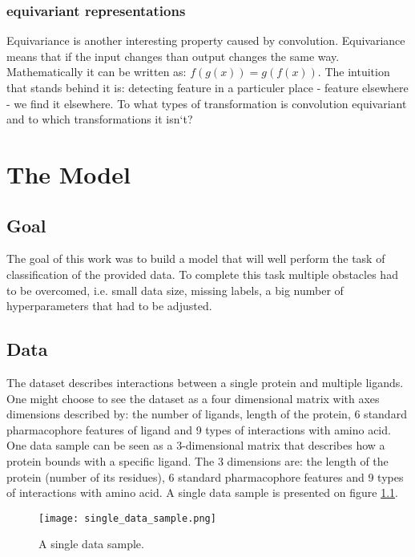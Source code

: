 \documentclass[a4paper,10pt]{report}
\begin{document}
	\subsection{equivariant representations} %
	  Equivariance is another interesting property caused by convolution. Equivariance means that if the input changes than output changes the same way. Mathematically it can be written as: $f(g(x)) = g(f(x))$. The intuition that stands behind it is: detecting feature in a particuler place - feature elsewhere - we find it elsewhere. To what types of transformation is convolution equivariant and to which transformations it isn`t? 
	
	
  \chapter{The Model}\label{chap:OUR_MODEL}
      
      \section{Goal}
      The goal of this work was to build a model that will well perform the task of classification of the provided data. To complete this task multiple obstacles had to be overcomed, i.e. small data size, missing labels, a big number of hyperparameters that had to be adjusted. 
     
	 
      
      \section{Data}\label{sec:OUR_DATA}
	The dataset describes interactions between a single protein and multiple ligands. One might choose to see the dataset as a four dimensional matrix with axes dimensions described by: the number of ligands, length of the protein, 6 standard pharmacophore features of ligand and 9 types of interactions with amino acid\cite{2DSIFT}. One data sample can be seen as a 3-dimensional matrix that describes how a protein bounds with a specific ligand. The 3 dimensions are: the length of the protein (number of its residues), 6 standard pharmacophore features and 9 types of interactions with amino acid. A single data sample is presented on figure \ref{fig:single_data_sample2}. 
	
	\begin{figure}[h!]
	  \centering
	  \texttt{[image: single\_data\_sample.png]}
	  \caption{A single data sample.}
	  \label{fig:single_data_sample2}
	\end{figure} 
	
\end{document}
